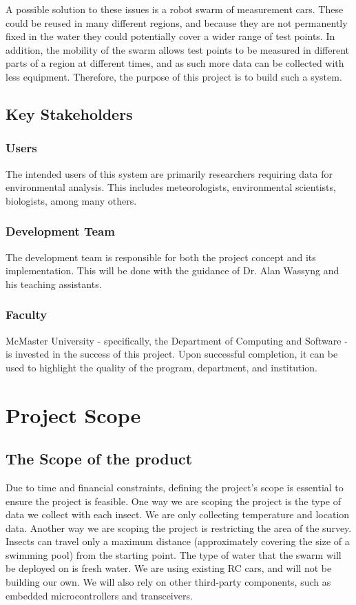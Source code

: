 \documentclass[11pt]{article}
\begin{document}
A possible solution to these issues is a robot swarm of measurement cars. These could be reused in many different regions, and because they are not permanently fixed in the water they could potentially cover a wider range of test points. In addition, the mobility of the swarm allows test points to be measured in different parts of a region at different times, and as such more data can be collected with less equipment. Therefore, the purpose of this project is to build such a system.

\subsection{Key Stakeholders}
\subsubsection{Users}
The intended users of this system are primarily researchers requiring data for environmental analysis. This includes meteorologists, environmental scientists, biologists, among many others.
\subsubsection{Development Team}
The development team is responsible for both the project concept and its implementation. This will be done with the guidance of Dr. Alan Wassyng and his teaching assistants.
\subsubsection{Faculty}
McMaster University - specifically, the Department of Computing and Software - is invested in the success of this project. Upon successful completion, it can be used to highlight the quality of the program, department, and institution.

\section{Project Scope}
\subsection{The Scope of the product}
Due to time and financial constraints, defining the project's scope is essential to ensure the project is feasible. One way we are scoping the project is the type of data we collect with each insect. We are only collecting temperature and location data. Another way we are scoping the project is restricting the area of the survey. Insects can travel only a maximum distance (approximately covering the size of a swimming pool) from the starting point. The type of water that the swarm will be deployed on is fresh water. We are using existing RC cars, and will not be building our own. We will also rely on other third-party components, such as embedded microcontrollers and transceivers.
\end{document}

